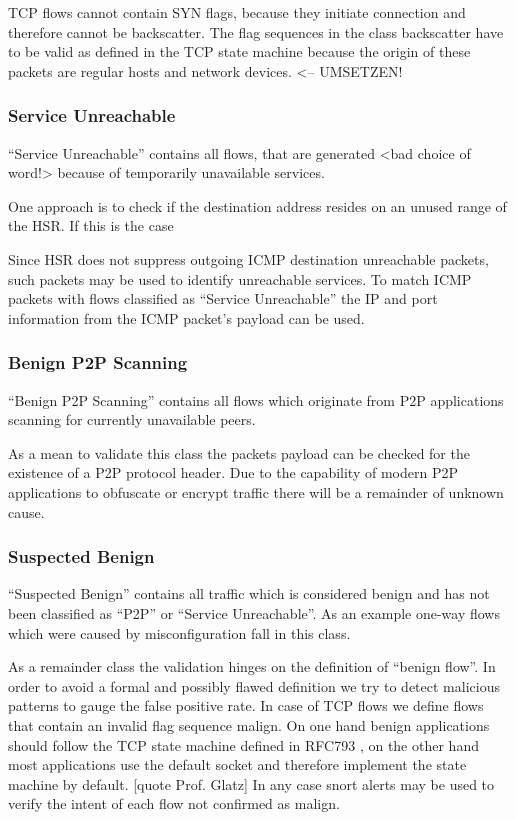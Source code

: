 \documentclass[a4paper]{scrartcl}
\begin{document}
TCP flows cannot contain SYN flags, because they initiate connection and therefore cannot be backscatter. The flag sequences in the class backscatter have to be valid as defined in the TCP state machine \cite{rfc_tcp} because the origin of these packets are regular hosts and network devices. <-- UMSETZEN!

\subsubsection{Service Unreachable}
``Service Unreachable'' contains all flows, that are generated <bad choice of word!> because of temporarily unavailable services.

One approach is to check if the destination address resides on an unused range of the HSR. If this is the case

Since HSR does not suppress outgoing ICMP destination unreachable packets, such packets may be used to identify unreachable services. To match ICMP packets with flows classified as ``Service Unreachable'' the IP and port information from the ICMP packet's payload \cite{rfc_icmp} can be used. 

\subsubsection{Benign P2P Scanning}
``Benign P2P Scanning'' contains all flows which originate from P2P applications scanning for currently unavailable peers.

As a mean to validate this class the packets payload can be checked for the existence of a P2P protocol header. Due to the capability of modern P2P applications to obfuscate \cite{emule} or encrypt \cite{vuze} traffic there will be a remainder of unknown cause.

\subsubsection{Suspected Benign}
``Suspected Benign'' contains all traffic which is considered benign and has not been classified as ``P2P'' or ``Service Unreachable''. As an example one-way flows which were caused by misconfiguration fall in this class.

As a remainder class the validation hinges on the definition of ``benign flow''. 
In order to avoid a formal and possibly flawed definition we try to detect malicious patterns to gauge the false positive rate.
In case of TCP flows we define flows that contain an invalid flag sequence malign. On one hand benign applications should follow the TCP state machine defined in RFC793 \cite{rfc_tcp}, on the other hand most applications use the default socket and therefore implement the state machine by default. [quote Prof. Glatz]
In any case snort alerts may be used to verify the intent of each flow not confirmed as malign.
\end{document}
